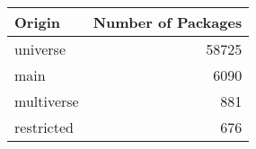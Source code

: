 \begin{tabular}{lr}
     Origin     &   Number of Packages \\
    \hline
     universe   &                58725 \\
     main       &                 6090 \\
     multiverse &                  881 \\
     restricted &                  676 \\
\end{tabular}